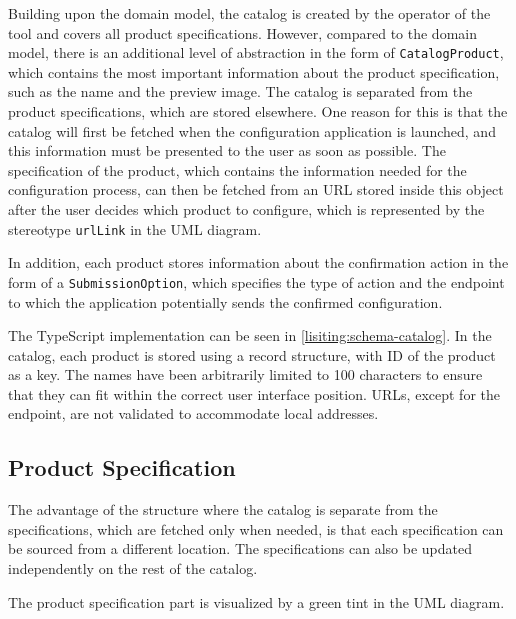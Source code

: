 Building upon the domain model, the catalog is created by the operator of the tool and covers all product specifications. However, compared to the domain model, there is an additional level of abstraction in the form of \texttt{CatalogProduct}, which contains the most important information about the product specification, such as the name and the preview image. The catalog is separated from the product specifications, which are stored elsewhere. One reason for this is that the catalog will first be fetched when the configuration application is launched, and this information must be presented to the user as soon as possible. The specification of the product, which contains the information needed for the configuration process, can then be fetched from an URL stored inside this object after the user decides which product to configure, which is represented by the stereotype \texttt{urlLink} in the UML diagram.

In addition, each product stores information about the confirmation action in the form of a \texttt{SubmissionOption}, which specifies the type of action and the endpoint to which the application potentially sends the confirmed configuration.

The TypeScript implementation can be seen in \autoref{lisiting:schema-catalog}. In the catalog, each product is stored using a record structure, with ID of the product as a key. The names have been arbitrarily limited to 100 characters to ensure that they can fit within the correct user interface position. URLs, except for the endpoint, are not validated to accommodate local addresses.


\subsection{Product Specification}

The advantage of the structure where the catalog is separate from the specifications, which are fetched only when needed, is that each specification can be sourced from a different location. The specifications can also be updated independently on the rest of the catalog.

The product specification part is visualized by a green tint in the UML diagram.  

